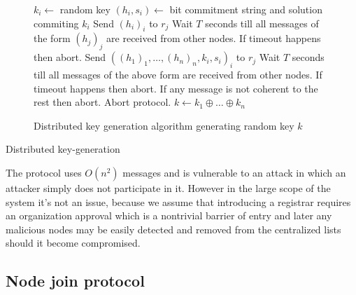 \begin{figure}
  \label{fig:key_gen_alg}
  \begin{algorithmic}[1]
  \STATE $k_i \leftarrow $ random key
  \STATE $(h_i, s_i) \leftarrow $ bit commitment string and solution commiting
  $k_i$
    \STATE Send $(h_i)_{i}$ to $r_j$
  \ENDFOR
  \STATE Wait $T$ seconds till all messages of the form $(h_j)_j$ are received
  from other nodes. If timeout happens then abort.
    \STATE Send $\left( (h_1)_1, \ldots, (h_n)_{n}, k_i, s_i\right)_i$ to $r_j$
  \ENDFOR
  \STATE Wait $T$ seconds till all messages of the above form are received
  from other nodes. If timeout happens then abort. If any message is not
  coherent to the rest then abort.
      \STATE Abort protocol.
    \ENDIF
  \ENDFOR
  \STATE $k \leftarrow k_1 \oplus \ldots \oplus k_n$
\end{algorithmic}
  \caption{Distributed key generation algorithm generating random key $k$}
\end{figure}


\begin{msc}{Distributed key-generation}
\setlength{\instdist}{5.5cm}
\setlength{\envinstdist}{3cm}
\nextlevel[5]
\nextlevel[2]
\nextlevel[2]
\nextlevel[2]
\nextlevel[2]
\nextlevel[2]
\end{msc}

The protocol uses $O\left(n^2\right)$ messages and is vulnerable to an attack in
which an attacker simply does not participate in it. However in the large scope
of the system it's not an issue, because we assume that introducing a registrar
requires an organization approval which is a nontrivial barrier of entry and
later any malicious nodes may be easily detected and removed from the
centralized lists should it become compromised.

\subsection{Node join protocol}

